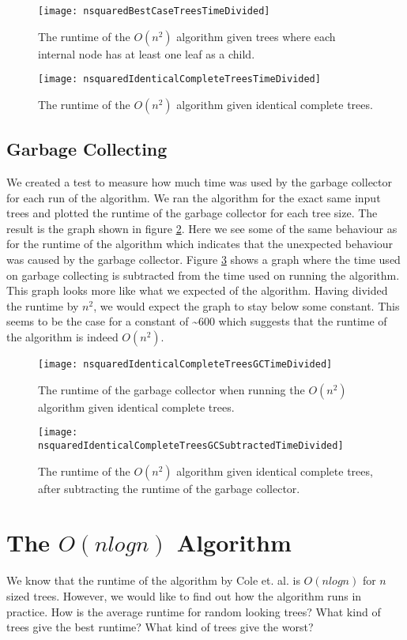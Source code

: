 \begin{figure}
	\texttt{[image: nsquaredBestCaseTreesTimeDivided]}
	\caption{The runtime of the $O(n^2)$ algorithm given trees where each internal node has at least one leaf as a child.}
	\label{nsquaredBestCaseTreesGraph}
	
	\texttt{[image: nsquaredIdenticalCompleteTreesTimeDivided]}
	\caption{The runtime of the $O(n^2)$ algorithm given identical complete trees.}
	\label{nsquaredIdenticalCompleteTreesGraph}
\end{figure}

\subsection{Garbage Collecting}
We created a test to measure how much time was used by the garbage collector for each run of the algorithm. We ran the algorithm for the exact same input trees and plotted the runtime of the garbage collector for each tree size. The result is the graph shown in figure \ref{nsquaredGCGraph}. Here we see some of the same behaviour as for the runtime of the algorithm which indicates that the unexpected behaviour was caused by the garbage collector. Figure \ref{nsquaredGCSubtractedGraph} shows a graph where the time used on garbage collecting is subtracted from the time used on running the algorithm. This graph looks more like what we expected of the algorithm. Having divided the runtime by $n^2$, we would expect the graph to stay below some constant. This seems to be the case for a constant of \textasciitilde 600 which suggests that the runtime of the algorithm is indeed $O(n^2)$.

\begin{figure}
	\texttt{[image: nsquaredIdenticalCompleteTreesGCTimeDivided]}
	\caption{The runtime of the garbage collector when running the $O(n^2)$ algorithm given identical complete trees.}
	\label{nsquaredGCGraph}
\end{figure}

\begin{figure}
	\texttt{[image: nsquaredIdenticalCompleteTreesGCSubtractedTimeDivided]}
	\caption{The runtime of the $O(n^2)$ algorithm given identical complete trees, after subtracting the runtime of the garbage collector.}
	\label{nsquaredGCSubtractedGraph}
\end{figure}

\section{The $O(nlogn)$ Algorithm}
We know that the runtime of the algorithm by Cole et. al. \cite{nlogn} is $O(nlogn)$ for $n$ sized trees. However, we would like to find out how the algorithm runs in practice. How is the average runtime for random looking trees? What kind of trees give the best runtime? What kind of trees give the worst?

